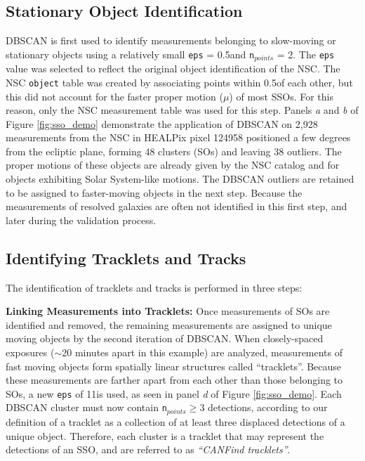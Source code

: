 \documentclass[twocolumn]{aastex62}
\begin{document}
\subsection{Stationary Object Identification}
\label{ssec:so}

DBSCAN is first used to identify measurements belonging to slow-moving or stationary objects using a relatively small \texttt{eps} = 0.5\arcsec and \texttt{n}$_{points}$ = 2.  The \texttt{eps} value was selected to reflect the original object identification of the NSC.  The NSC \texttt{object} table was created by associating points within 0.5\arcsec of each other, but this did not account for the faster proper motion ($\mu$) of most SSOs.  For this reason, only the NSC measurement table was used for this step.  Panels {\em a} and {\em b} of Figure \ref{fig:sso_demo} demonstrate the application of DBSCAN on 2,928 measurements from the NSC in HEALPix pixel 124958 positioned a few degrees from the ecliptic plane, forming 48 clusters (SOs) and leaving 38 outliers.  The proper motions of these objects are already given by the NSC catalog and  for objects exhibiting Solar System-like motions.  The DBSCAN outliers are retained to be assigned to faster-moving objects in the next step.  Because the  measurements of  resolved galaxies  are often not identified in this first step, and later during the validation process.





\subsection{Identifying Tracklets and Tracks}
\label{ssec:mo}
The identification of tracklets and tracks is performed in three steps:

{\bf Linking Measurements into Tracklets:} Once measurements of SOs are identified and removed, the remaining measurements are assigned to unique moving objects by the second iteration of DBSCAN.  When closely-spaced exposures ($\sim$20 minutes apart in this example) are analyzed, measurements of fast moving objects form spatially linear structures called ``tracklets''.  Because these measurements are farther apart from each other than those belonging to SOs, a new \texttt{eps} of 11\arcsec is used, as seen in panel {\em d} of Figure \ref{fig:sso_demo}.  Each DBSCAN cluster must now contain \texttt{n}$_{points} \geq 3$ detections, according to our definition of a tracklet as a collection of at least three displaced detections of a unique object.  Therefore, each cluster is a tracklet that may represent the detections of an SSO, and are referred to as \textit{``CANFind tracklets''}.
\end{document}
